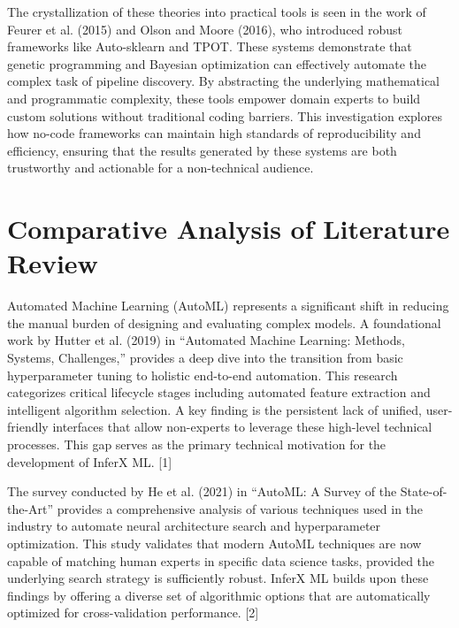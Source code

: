 The crystallization of these theories into practical tools is seen in the work of Feurer et al. (2015) and Olson and Moore (2016), who introduced robust frameworks like Auto-sklearn and TPOT. These systems demonstrate that genetic programming and Bayesian optimization can effectively automate the complex task of pipeline discovery. By abstracting the underlying mathematical and programmatic complexity, these tools empower domain experts to build custom solutions without traditional coding barriers. This investigation explores how no-code frameworks can maintain high standards of reproducibility and efficiency, ensuring that the results generated by these systems are both trustworthy and actionable for a non-technical audience.\vspace{0.4cm}

\clearpage

\section{Comparative Analysis of Literature Review}

Automated Machine Learning (AutoML) represents a significant shift in reducing the manual burden of designing and evaluating complex models. A foundational work by Hutter et al. (2019) in ``Automated Machine Learning: Methods, Systems, Challenges,'' provides a deep dive into the transition from basic hyperparameter tuning to holistic end-to-end automation. This research categorizes critical lifecycle stages including automated feature extraction and intelligent algorithm selection. A key finding is the persistent lack of unified, user-friendly interfaces that allow non-experts to leverage these high-level technical processes. This gap serves as the primary technical motivation for the development of InferX ML. [1]\vspace{0.4cm}

The survey conducted by He et al. (2021) in ``AutoML: A Survey of the State-of-the-Art'' provides a comprehensive analysis of various techniques used in the industry to automate neural architecture search and hyperparameter optimization. This study validates that modern AutoML techniques are now capable of matching human experts in specific data science tasks, provided the underlying search strategy is sufficiently robust. InferX ML builds upon these findings by offering a diverse set of algorithmic options that are automatically optimized for cross-validation performance. [2]\vspace{0.4cm}

